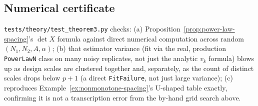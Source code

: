\subsection{Numerical certificate}
\label{sec:theorem3-certificate}

\texttt{tests/theory/test\_theorem3.py} checks: (a) Proposition~\ref{prop:power-law-spacing}'s
$\det X$ formula against direct numerical computation across random
$(N_1,N_2,A,\alpha)$; (b) that estimator variance (fit via the real, production
\texttt{PowerLawN} class on many noisy replicates, not just the analytic $v_k$ formula)
blows up as design scales are clustered together and, separately, as the count of
distinct scales drops below $p+1$ (a direct \texttt{FitFailure}, not just large
variance); (c) reproduces Example~\ref{ex:nonmonotone-spacing}'s U-shaped table exactly,
confirming it is not a transcription error from the by-hand grid search above.

